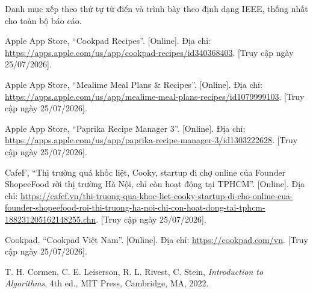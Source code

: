 
Danh mục xếp theo thứ tự từ điển và trình bày theo định dạng IEEE, thống nhất cho
toàn bộ báo cáo.

\newcommand{\tltklabel}[1]{#1\hfill}

\begin{list}{}{%
  \setlength{\labelwidth}{2.2em}
  \setlength{\leftmargin}{2.6em}
  \setlength{\labelsep}{0.4em}
  \setlength{\itemsep}{4pt}
  \setlength{\parsep}{0pt}
  \let\makelabel\tltklabel
}

\item[{[1]}] Apple App Store, ``Cookpad Recipes''. [Online]. Địa chỉ:
\url{https://apps.apple.com/us/app/cookpad-recipes/id340368403}. [Truy cập ngày
25/07/2026].

\item[{[2]}] Apple App Store, ``Mealime Meal Plans \& Recipes''. [Online]. Địa
chỉ: \url{https://apps.apple.com/us/app/mealime-meal-plans-recipes/id1079999103}.
[Truy cập ngày 25/07/2026].

\item[{[3]}] Apple App Store, ``Paprika Recipe Manager 3''. [Online]. Địa chỉ:
\url{https://apps.apple.com/us/app/paprika-recipe-manager-3/id1303222628}. [Truy
cập ngày 25/07/2026].

\item[{[4]}] CafeF, ``Thị trường quá khốc liệt, Cooky, startup đi chợ online của
Founder ShopeeFood rời thị trường Hà Nội, chỉ còn hoạt động tại TPHCM''.
[Online]. Địa chỉ:
\url{https://cafef.vn/thi-truong-qua-khoc-liet-cooky-startup-di-cho-online-cua-founder-shopeefood-roi-thi-truong-ha-noi-chi-con-hoat-dong-tai-tphcm-188231205162148255.chn}.
[Truy cập ngày 25/07/2026].

\item[{[5]}] Cookpad, ``Cookpad Việt Nam''. [Online]. Địa chỉ:
\url{https://cookpad.com/vn}. [Truy cập ngày 25/07/2026].

\item[{[6]}] T. H. Cormen, C. E. Leiserson, R. L. Rivest, C. Stein,
\textit{Introduction to Algorithms}, 4th ed., MIT Press, Cambridge, MA, 2022.


\end{list}
